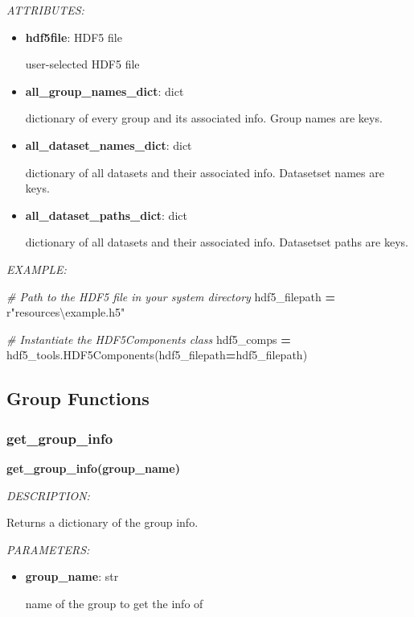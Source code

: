 \documentclass[
]{article}
\newenvironment{Shaded}{\begin{snugshade}}{\end{snugshade}}
\newcommand{\CommentTok}[1]{\textcolor[rgb]{0.56,0.35,0.01}{\textit{#1}}}
\newcommand{\NormalTok}[1]{#1}
\newcommand{\OperatorTok}[1]{\textcolor[rgb]{0.81,0.36,0.00}{\textbf{#1}}}
\newcommand{\VerbatimStringTok}[1]{\textcolor[rgb]{0.31,0.60,0.02}{#1}}
\begin{document}
\emph{ATTRIBUTES:}

\begin{itemize}
\item
  \textbf{hdf5file}: HDF5 file

  user-selected HDF5 file
\item
  \textbf{all\_group\_names\_dict}: dict

  dictionary of every group and its associated info. Group names are keys.
\item
  \textbf{all\_dataset\_names\_dict}: dict

  dictionary of all datasets and their associated info. Datasetset names are keys.
\item
  \textbf{all\_dataset\_paths\_dict}: dict

  dictionary of all datasets and their associated info. Datasetset paths are keys.
\end{itemize}

\emph{EXAMPLE:}

\begin{Shaded}
\begin{Highlighting}[]
\CommentTok{# Path to the HDF5 file in your system directory}
\NormalTok{hdf5_filepath }\OperatorTok{=} \VerbatimStringTok{r"resources\textbackslash{}example.h5"}

\CommentTok{# Instantiate the HDF5Components class}
\NormalTok{hdf5_comps }\OperatorTok{=}\NormalTok{ hdf5_tools.HDF5Components(hdf5_filepath}\OperatorTok{=}\NormalTok{hdf5_filepath)}
\end{Highlighting}
\end{Shaded}

\hypertarget{group-functions-1}{%
\subsection{Group Functions}\label{group-functions-1}}

\hypertarget{get_group_info}{%
\subsubsection{get\_group\_info}\label{get_group_info}}

\textbf{get\_group\_info(group\_name)}

\emph{DESCRIPTION:}

Returns a dictionary of the group info.

\emph{PARAMETERS:}

\begin{itemize}
\item
  \textbf{group\_name}: str

  name of the group to get the info of
\end{itemize}
\end{document}
